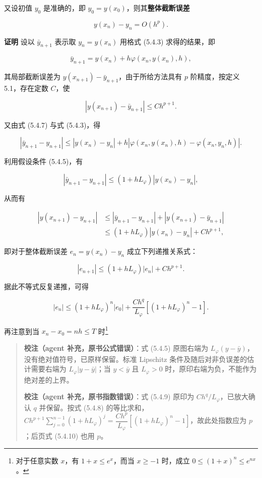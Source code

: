 \documentclass[
  10pt,
  fontset=fandol]{ctexart}
\begin{document}
又设初值 \(y_0\) 是准确的，即 \(y_0=y(x_0)\)，则其\textbf{整体截断误差}

\[
y(x_n)-y_n=O(h^p).\tag{5.4.6}
\]

\textbf{证明} 设以 \(\bar y_{n+1}\) 表示取 \(y_n=y(x_n)\) 用格式 (5.4.3) 求得的结果，即

\[
\bar y_{n+1}=y(x_n)+h\varphi(x_n,y(x_n),h),\tag{5.4.7}
\]

其局部截断误差为 \(y(x_{n+1})-\bar y_{n+1}\)，由于所给方法具有 \(p\) 阶精度，按定义 5.1，存在定数 \(C\)，使

\[
|y(x_{n+1})-\bar y_{n+1}|\leqslant Ch^{p+1}.
\]

又由式 (5.4.7) 与式 (5.4.3)，得

\[
|\bar y_{n+1}-y_{n+1}|\leqslant|y(x_n)-y_n|+h|\varphi(x_n,y(x_n),h)-\varphi(x_n,y_n,h)|.
\]

利用假设条件 (5.4.5)，有

\[
|\bar y_{n+1}-y_{n+1}|\leqslant(1+hL_\varphi)|y(x_n)-y_n|,
\]

从而有

\[
\begin{aligned}
|y(x_{n+1})-y_{n+1}|&\leqslant|\bar y_{n+1}-y_{n+1}|+|y(x_{n+1})-\bar y_{n+1}|\\
&\leqslant(1+hL_\varphi)|y(x_n)-y_n|+Ch^{p+1},
\end{aligned}
\]

即对于整体截断误差 \(e_n=y(x_n)-y_n\) 成立下列递推关系式：

\[
|e_{n+1}|\leqslant(1+hL_\varphi)|e_n|+Ch^{p+1}.\tag{5.4.8}
\]

据此不等式反复递推，可得

\[
|e_n|\leqslant(1+hL_\varphi)^n|e_0|+\frac{Ch^q}{L_\varphi}[(1+hL_\varphi)^n-1].\tag{5.4.9}
\]

再注意到当 \(x_n-x_0=nh\leqslant T\) 时\footnote{对于任意实数 \(x\)，有 \(1+x\leqslant e^x\)，而当 \(x\geqslant-1\) 时，成立 \(0\leqslant(1+x)^n\leqslant e^{nx}\)。}

\begin{quote}
\textbf{校注（agent 补充，原书公式错误）}：式 (5.4.5) 原图右端为 \(L_\varphi(y-\bar y)\)，没有绝对值符号，已原样保留。标准 Lipschitz 条件及随后对非负误差的估计需要右端为 \(L_\varphi|y-\bar y|\)；当 \(y<\bar y\) 且 \(L_\varphi>0\) 时，原印右端为负，不能作为绝对差的上界。

\textbf{校注（agent 补充，原书指数错误）}：式 (5.4.9) 原印为 \(Ch^q/L_\varphi\)，已放大确认 \(q\) 并保留。按式 (5.4.8) 的等比求和，\(Ch^{p+1}\sum_{j=0}^{n-1}(1+hL_\varphi)^j=\dfrac{Ch^p}{L_\varphi}[(1+hL_\varphi)^n-1]\)，故此处指数应为 \(p\)；后页式 (5.4.10) 也用 \(p\)。
\end{quote}
\end{document}

